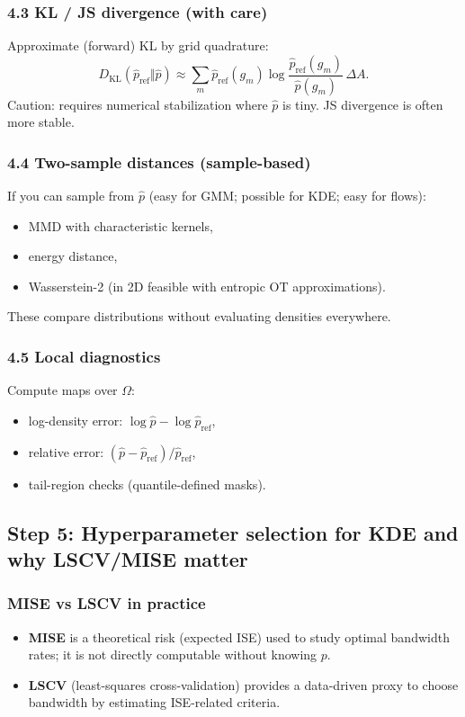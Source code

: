 \documentclass[twocolumn]{notes}
\begin{document}
\subsubsection{4.3 KL / JS divergence (with care)}
Approximate (forward) KL by grid quadrature:
\[
D_{\mathrm{KL}}(\hat p_{\mathrm{ref}}\Vert \hat p)\approx \sum_m \hat p_{\mathrm{ref}}(g_m)\log\frac{\hat p_{\mathrm{ref}}(g_m)}{\hat p(g_m)}\,\Delta A.
\]
Caution: requires numerical stabilization where $\hat p$ is tiny. JS divergence is often more stable.

\subsubsection{4.4 Two-sample distances (sample-based)}
If you can sample from $\hat p$ (easy for GMM; possible for KDE; easy for flows):
\begin{itemize}[leftmargin=2em]
\item MMD with characteristic kernels,
\item energy distance,
\item Wasserstein-2 (in 2D feasible with entropic OT approximations).
\end{itemize}
These compare distributions without evaluating densities everywhere.

\subsubsection{4.5 Local diagnostics}
Compute maps over $\Omega$:
\begin{itemize}[leftmargin=2em]
\item log-density error: $\log \hat p - \log \hat p_{\mathrm{ref}}$,
\item relative error: $(\hat p-\hat p_{\mathrm{ref}})/\hat p_{\mathrm{ref}}$,
\item tail-region checks (quantile-defined masks).
\end{itemize}

\subsection{Step 5: Hyperparameter selection for KDE and why LSCV/MISE matter}

\subsubsection{MISE vs LSCV in practice}
\begin{itemize}[leftmargin=2em]
\item \textbf{MISE} is a theoretical risk (expected ISE) used to study optimal bandwidth rates; it is not directly computable without knowing $p$.
\item \textbf{LSCV} (least-squares cross-validation) provides a data-driven proxy to choose bandwidth by estimating ISE-related criteria.
\end{itemize}
\end{document}
